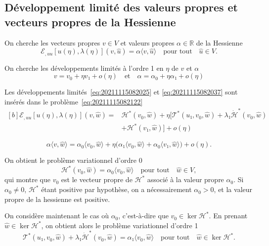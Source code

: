 \documentclass[12pt, final]{amsart}
\newcommand{\reals}{\mathbb{R}}
\begin{document}
\subsection{Développement limité des valeurs propres et vecteurs propres de la Hessienne}

On cherche les vecteurs propres \(v∈ V\) et valeurs propres
\(\alpha∈\reals\) de la Hessienne
\begin{equation}
  \label{eq:20211115082122}
  ℰ_{,uu}[u(η), \lambda(η)](v, \hat{u})
  =\alpha〈 v, \hat{u}〉
  \quad\text{pour tout}\quad\hat{u}∈ V.
\end{equation}

On cherche les développements limités à l'ordre 1 en \(η\) de \(v\) et \(\alpha\)
\begin{equation}
  \label{eq:20211115082037}
  v = v_0+η v₁+o(η)
  \quad\text{et}\quad
  \alpha=\alpha_0+η\alpha₁+o(η)
\end{equation}

Les développements limités~\eqref{eq:20211115082025} et
\eqref{eq:20211115082037} sont insérés dans le
problème~\eqref{eq:20211115082122}
\begin{equation}
  \begin{aligned}[b]
    ℰ_{,uu}[u(η), \lambda(η)](v, \hat{w})={}
    &\mathcal H^\ast(v_0, \hat{w})
    +η\bigl[\mathcal T^\ast(u₁, v_0, \hat{w})
    +\lambda₁\dot{\mathcal H}^\ast(v_0, \hat{w})\\
    &+\mathcal H^\ast(v₁, \hat{w})\bigr]+o(η)
  \end{aligned}
\end{equation}

\begin{equation}
  \alpha〈 v, \hat{w}〉=\alpha_0〈 v_0, \hat{w}〉
  +η\bigl(\alpha₁〈 v_0, \hat{w}〉+\alpha_0〈 v₁, \hat{w}〉\bigr)
  +o(η).
\end{equation}

On obtient le problème variationnel d'ordre 0
\begin{equation}
  \mathcal H^\ast(v_0, \hat{w})=\alpha_0〈 v_0, \hat{w}〉
  \quad\text{pour tout}\quad\hat{w}∈ V,
\end{equation}
qui montre que \(v_0\) est le vecteur propre de \(\mathcal H^\ast\) associé à
la valeur propre \(\alpha_0\). Si \(\alpha_0≠ 0\), \(\mathcal H^\ast\) étant
positive par hypothèse, on a nécessairement \(\alpha_0>0\), et la valeur propre
de la hessienne est positive.

On considère maintenant le cas où \(\alpha_0\), c'est-à-dire que
\(v_0∈\ker\mathcal H^\ast\). En prenant \(\hat{w}∈\ker\mathcal H^\ast\), on
obtient alors le problème variationnel d'ordre 1
\begin{equation}
  \mathcal T^\ast(u₁, v_0, \hat{w})
  +\lambda₁\dot{\mathcal H}^\ast(v_0, \hat{w})
  =\alpha₁〈v_0, \hat{w}〉
  \quad\text{pour tout}\quad
  \hat{w}∈\ker\mathcal H^\ast.
\end{equation}
\end{document}
